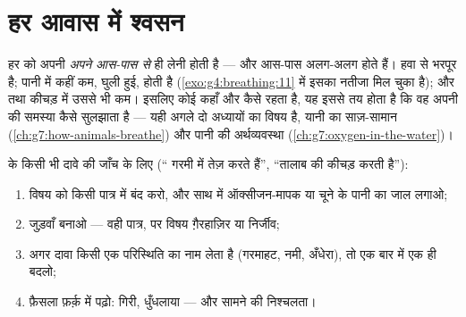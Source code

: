 \section{हर आवास में श्वसन}

\begin{proposition}[एक ही ज़रूरत, कई तरह के आस-पास]\label{prop:g7:what-is-respiration:habitats}
हर  को अपनी  \emph{अपने आस-पास से} ही लेनी होती है --- और
आस-पास अलग-अलग होते हैं। हवा  से भरपूर है; पानी में कहीं कम,
घुली हुई, होती है (\cref{exo:g4:breathing:11} में इसका नतीजा मिल चुका
है); और  तथा कीचड़ में उससे भी कम। इसलिए कोई  कहाँ और कैसे
रहता है, यह इससे तय होता है कि वह अपनी  की समस्या कैसे सुलझाता
है --- यही अगले दो अध्यायों का विषय है, यानी  का साज़-सामान
(\cref{ch:g7:how-animals-breathe}) और पानी की अर्थव्यवस्था
(\cref{ch:g7:oxygen-in-the-water})।
\end{proposition}
\admitted

\begin{method}[श्वसन के किसी सवाल की जाँच]\label{met:g7:what-is-respiration:test}
 के किसी भी दावे की जाँच के लिए (`` गरमी में तेज़  करते
हैं'', ``तालाब की कीचड़  करती है''):
\begin{enumerate}
  \item विषय को किसी पात्र में बंद करो, और साथ में ऑक्सीजन-मापक या
        चूने के पानी का जाल लगाओ;
  \item जुड़वाँ  बनाओ --- वही पात्र, पर विषय ग़ैरहाज़िर या
        निर्जीव;
  \item अगर दावा किसी एक परिस्थिति का नाम लेता है (गरमाहट, नमी,
        अँधेरा), तो एक बार में एक ही बदलो;
  \item फ़ैसला फ़र्क़ में पढ़ो:  गिरी,  धुँधलाया ---
        और सामने  की निश्चलता।
\end{enumerate}
\end{method}

